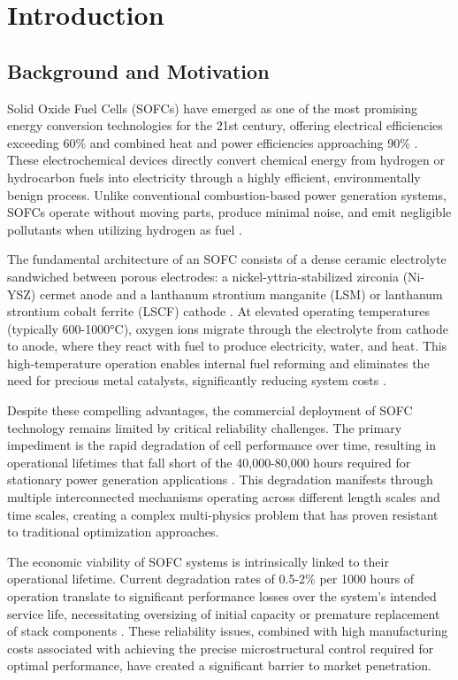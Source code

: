 \documentclass[conference]{IEEEtran}
\begin{document}
\section{Introduction}

\subsection{Background and Motivation}

Solid Oxide Fuel Cells (SOFCs) have emerged as one of the most promising energy conversion technologies for the 21st century, offering electrical efficiencies exceeding 60\% and combined heat and power efficiencies approaching 90\% \cite{singh2024sofc, mahato2024review}. These electrochemical devices directly convert chemical energy from hydrogen or hydrocarbon fuels into electricity through a highly efficient, environmentally benign process. Unlike conventional combustion-based power generation systems, SOFCs operate without moving parts, produce minimal noise, and emit negligible pollutants when utilizing hydrogen as fuel \cite{wang2023advances}.

The fundamental architecture of an SOFC consists of a dense ceramic electrolyte sandwiched between porous electrodes: a nickel-yttria-stabilized zirconia (Ni-YSZ) cermet anode and a lanthanum strontium manganite (LSM) or lanthanum strontium cobalt ferrite (LSCF) cathode \cite{zhang2024materials}. At elevated operating temperatures (typically 600-1000°C), oxygen ions migrate through the electrolyte from cathode to anode, where they react with fuel to produce electricity, water, and heat. This high-temperature operation enables internal fuel reforming and eliminates the need for precious metal catalysts, significantly reducing system costs \cite{liu2023sofc}.

Despite these compelling advantages, the commercial deployment of SOFC technology remains limited by critical reliability challenges. The primary impediment is the rapid degradation of cell performance over time, resulting in operational lifetimes that fall short of the 40,000-80,000 hours required for stationary power generation applications \cite{khan2024degradation}. This degradation manifests through multiple interconnected mechanisms operating across different length scales and time scales, creating a complex multi-physics problem that has proven resistant to traditional optimization approaches.

The economic viability of SOFC systems is intrinsically linked to their operational lifetime. Current degradation rates of 0.5-2\% per 1000 hours of operation translate to significant performance losses over the system's intended service life, necessitating oversizing of initial capacity or premature replacement of stack components \cite{peters2023economics}. These reliability issues, combined with high manufacturing costs associated with achieving the precise microstructural control required for optimal performance, have created a significant barrier to market penetration.
\end{document}
